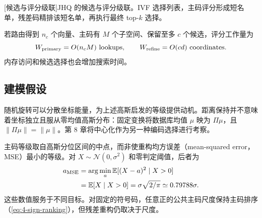 \par\medskip\noindent\begin{minipage}{\linewidth}
\centering\captionsetup{hypcap=false}
\resizebox{\linewidth}{!}{}
[候选与评分级联]{JHQ 的候选与评分级联。IVF 选择列表，主码评分形成短名单，残差码精排该短名单，再执行最终 top-$k$ 选择。}
\label{fig:2-cascade}
\end{minipage}\par\medskip

若路由得到 $n_c$ 个向量、主码有 $M$ 个子空间、保留至多 $c$ 个候选，评分工作量为
\[
 W_{\rm primary}=O(n_cM)\ \text{lookups},\qquad
 W_{\rm refine}=O(cd)\ \text{coordinates}.
\]
内存访问和候选选择也会增加搜索时间。

\subsection{建模假设}

随机旋转可以分散坐标能量，为上述高斯启发的等级提供动机。距离保持并不意味着坐标独立且服从零均值高斯分布：固定变换将数据库均值 $\mu$ 映为 $\Pi\mu$，且 $\|\Pi\mu\|=\|\mu\|$。第 8 章将中心化作为另一种编码选择进行考察。

主码等级取自高斯分位区间的中点，而非使重构均方误差（mean-squared error，MSE）最小的等级。对 $X\sim\mathcal N(0,\sigma^2)$ 和零判定阈值，后者为
\[
 \begin{aligned}
 a_{\rm MSE}
 &=\arg\min_a\mathbb E[(X-a)^2\mid X>0]\\
 &=\mathbb E[X\mid X>0]
 =\sigma\sqrt{2/\pi}\simeq0.79788\sigma.
 \end{aligned}
\]
这些数值服务于不同目标。对固定的符号码，任意正的公共主码尺度保持主码排序（\cref{eq:4-sign-ranking}），但残差重构仍取决于尺度。
